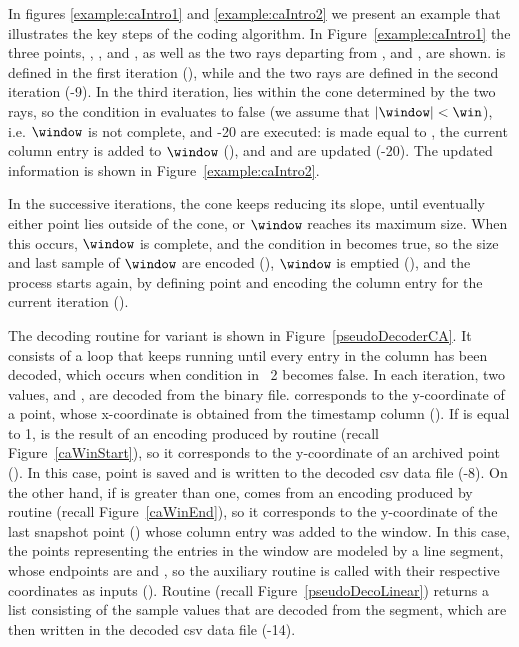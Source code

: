 In figures \ref{example:caIntro1} and \ref{example:caIntro2} we present an example that illustrates the key steps of the coding algorithm. In Figure~\ref{example:caIntro1} the three points, \archived, \snapshot, and \incoming, as well as the two rays departing from \archived, \smin and \smax, are shown. \archived is defined in the first iteration (), while \snapshot and the two rays are defined in the second iteration (-9). In the third iteration, \incoming lies within the cone determined by the two rays, so the condition in  evaluates to false (we assume that $|\window|<\win$), i.e. $\window$ is not complete, and -20 are executed: \snapshot is made equal to \incoming, the current column entry is added to $\window$ (), and \smin and \smax are updated (-20). The updated information is shown in Figure~\ref{example:caIntro2}. 


\vspace{+5pt}
\exampleCA


\clearpage


In the successive iterations, the cone keeps reducing its slope, until eventually either point \incoming lies outside of the cone, or $\window$ reaches its maximum size. When this occurs, $\window$ is complete, and the condition in  becomes true, so the size and last sample of $\window$ are encoded (), $\window$ is emptied (), and the process starts again, by defining point \archived and encoding the column entry for the current iteration ().


The decoding routine for variant \maskalgo is shown in Figure~\ref{pseudoDecoderCA}. It consists of a loop that keeps running until every entry in the column has been decoded, which occurs when condition in \Line~2 becomes false. In each iteration, two values, \sizee and , are decoded from the binary file.  corresponds to the y-coordinate of a point, whose x-coordinate is obtained from the timestamp column (). If \sizee is equal to 1,  is the result of an encoding produced by routine \CAWinStart (recall Figure~\ref{caWinStart}), so it corresponds to the y-coordinate of an archived point (\archived). In this case, point \archived is saved and  is written to the decoded csv data file (-8). On the other hand, if \sizee is greater than one,  comes from an encoding produced by routine \CAWinEnd (recall Figure~\ref{caWinEnd}), so it corresponds to the y-coordinate of the last snapshot point (\snapshot) whose column entry was added to the window. In this case, the points representing the entries in the window are modeled by a line segment, whose endpoints are \archived and \snapshot, so the auxiliary routine \decodeSegment is called with their respective coordinates as inputs (). Routine \decodeSegment (recall Figure~\ref{pseudoDecoLinear}) returns a list consisting of the sample values that are decoded from the segment, which are then written in the decoded csv data file (-14).


